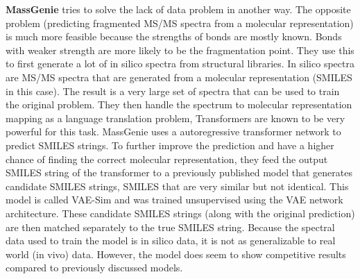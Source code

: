\textbf{MassGenie} \cite{shrivastava2021massgenie} tries to solve the lack of data problem in another way. The opposite problem (predicting fragmented \ac{MS/MS} spectra from a molecular representation) is much more feasible because the strengths of bonds are mostly known. Bonds with weaker strength are more likely to be the fragmentation point. They use this to first generate a lot of in silico spectra from structural libraries. In silico spectra are \ac{MS/MS} spectra that are generated from a molecular representation (SMILES in this case). The result is a very large set of spectra that can be used to train the original problem. They then handle the spectrum to molecular representation mapping as a language translation problem, Transformers are known to be very powerful for this task. MassGenie uses a autoregressive transformer network to predict SMILES strings. 
To further improve the prediction and have a higher chance of finding the correct molecular representation, they feed the output SMILES string of the transformer to a previously published model that generates candidate SMILES strings, SMILES that are very similar but not identical. This model is called VAE-Sim \cite{samanta2020vae} and was trained unsupervised using the \ac{VAE} network architecture. These candidate SMILES strings (along with the original prediction) are then matched separately to the true SMILES string.
Because the spectral data used to train the model is in silico data, it is not as generalizable to real world (in vivo) data. However, the model does seem to show competitive results compared to previously discussed models.

